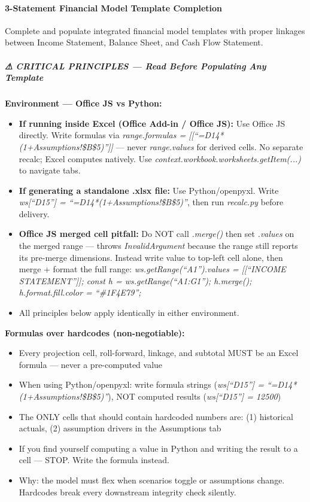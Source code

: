 \documentclass[11pt]{article}
\begin{document}
\paragraph{3-Statement Financial Model Template Completion}\mbox{}\par

Complete and populate integrated financial model templates with proper linkages between Income Statement, Balance Sheet, and Cash Flow Statement.


\subparagraph{⚠ CRITICAL PRINCIPLES — Read Before Populating Any Template}\mbox{}\par

\textbf{Environment — Office JS vs Python:}

\begin{itemize}[leftmargin=*,itemsep=2pt,topsep=2pt]
\item {} \textbf{If running inside Excel (Office Add-in / Office JS):} Use Office JS directly. Write formulas via \emph{range.formulas = [[``=D14*(1+Assumptions!\$B\$5)'']]} — never \emph{range.values} for derived cells. No separate recalc; Excel computes natively. Use \emph{context.workbook.worksheets.getItem(...)} to navigate tabs.
\item {} \textbf{If generating a standalone .xlsx file:} Use Python/openpyxl. Write \emph{ws[``D15''] = ``=D14*(1+Assumptions!\$B\$5)''}, then run \emph{recalc.py} before delivery.
\item {} \textbf{Office JS merged cell pitfall:} Do NOT call \emph{.merge()} then set \emph{.values} on the merged range — throws \emph{InvalidArgument} because the range still reports its pre-merge dimensions. Instead write value to top-left cell alone, then merge + format the full range: \emph{ws.getRange(``A1'').values = [[``INCOME STATEMENT'']]; const h = ws.getRange(``A1:G1''); h.merge(); h.format.fill.color = ``\#1F4E79'';}
\item {} All principles below apply identically in either environment.
\end{itemize}

\textbf{Formulas over hardcodes (non-negotiable):}

\begin{itemize}[leftmargin=*,itemsep=2pt,topsep=2pt]
\item {} Every projection cell, roll-forward, linkage, and subtotal MUST be an Excel formula — never a pre-computed value
\item {} When using Python/openpyxl: write formula strings (\emph{ws[``D15''] = ``=D14*(1+Assumptions!\$B\$5)''}), NOT computed results (\emph{ws[``D15''] = 12500})
\item {} The ONLY cells that should contain hardcoded numbers are: (1) historical actuals, (2) assumption drivers in the Assumptions tab
\item {} If you find yourself computing a value in Python and writing the result to a cell — STOP. Write the formula instead.
\item {} Why: the model must flex when scenarios toggle or assumptions change. Hardcodes break every downstream integrity check silently.
\end{itemize}
\end{document}
